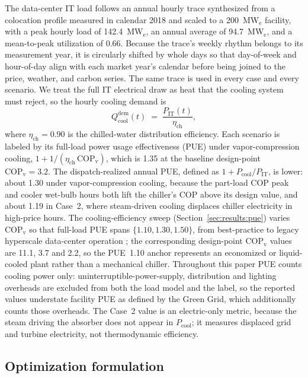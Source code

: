 \documentclass[a4paper,fleqn]{cas-sc}
\begin{document}
The data-center IT load follows an annual hourly trace synthesized from a colocation profile measured in calendar 2018 and scaled to a 200~MW$_\mathrm{e}$ facility, with a peak hourly load of 142.4~MW$_\mathrm{e}$, an annual average of 94.7~MW$_\mathrm{e}$, and a mean-to-peak utilization of 0.66.
Because the trace's weekly rhythm belongs to its measurement year, it is circularly shifted by whole days so that day-of-week and hour-of-day align with each market year's calendar before being joined to the price, weather, and carbon series.
The same trace is used in every case and every scenario. We treat the full IT electrical draw as heat that the cooling system must reject, so the hourly cooling demand is
\begin{equation}
\label{eq:cool_demand}
Q_\mathrm{cool}^\mathrm{dem}(t) \;=\; \frac{P_\mathrm{IT}(t)}{\eta_\mathrm{ch}},
\end{equation}
where $\eta_\mathrm{ch}=0.90$ is the chilled-water distribution efficiency. Each scenario is labeled by its full-load power usage effectiveness (PUE) under vapor-compression cooling, $1+1/(\eta_\mathrm{ch}\,\mathrm{COP}_\mathrm{v})$, which is 1.35 at the baseline design-point $\mathrm{COP}_\mathrm{v}=3.2$. The dispatch-realized annual PUE, defined as $1+P_\mathrm{cool}/P_\mathrm{IT}$, is lower: about 1.30 under vapor-compression cooling, because the part-load COP peak and cooler wet-bulb hours both lift the chiller's COP above its design value, and about 1.19 in Case~2, where steam-driven cooling displaces chiller electricity in high-price hours. The cooling-efficiency sweep (Section~\ref{sec:results:pue}) varies $\mathrm{COP}_\mathrm{v}$ so that full-load PUE spans $\{1.10, 1.30, 1.50\}$, from best-practice to legacy hyperscale data-center operation \citep{greenGrid2012pue,ashrae2021thermal}; the corresponding design-point $\mathrm{COP}_\mathrm{v}$ values are 11.1, 3.7 and 2.2, so the PUE~1.10 anchor represents an economized or liquid-cooled plant rather than a mechanical chiller. Throughout this paper PUE counts cooling power only: uninterruptible-power-supply, distribution and lighting overheads are excluded from both the load model and the label, so the reported values understate facility PUE as defined by the Green Grid, which additionally counts those overheads. The Case~2 value is an electric-only metric, because the steam driving the absorber does not appear in $P_\mathrm{cool}$; it measures displaced grid and turbine electricity, not thermodynamic efficiency.

\subsection{Optimization formulation}
\label{sec:methods:opt}
\end{document}
